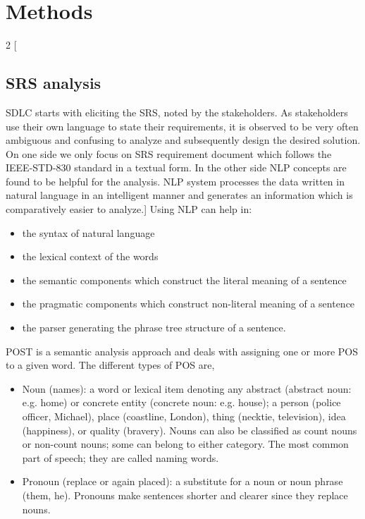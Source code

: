 \section{Methods}
	\begin{multicols*}{2}
		[\subsection{\gls{SRS} analysis}
		\gls{SDLC} starts with eliciting the \gls{SRS}, noted by the stakeholders. As stakeholders use their own language to state their requirements, it is observed to be very often ambiguous and confusing to analyze and subsequently design the desired solution. On one side we only focus on \gls{SRS} requirement document which follows the IEEE-STD-830 standard in a textual form. In the other side \gls{NLP} concepts are found to be helpful for the analysis. \gls{NLP} system processes the data written in natural language in an intelligent manner and generates an information which is comparatively easier to analyze.\cite{Tripathy}]
		Using \gls{NLP} can help in:
		\begin{itemize}
			\item the syntax of natural language
			\item the lexical context of the words
			\item the semantic components which construct the literal meaning of a sentence
			\item the pragmatic components which construct non-literal meaning of a sentence
			\item the parser generating the phrase tree structure of a sentence.
		\end{itemize}
		\gls{POST} is a semantic analysis approach and deals with assigning one or more \gls{POS} to a given word. The different types of \gls{POS} are,
		\begin{itemize}
			\item Noun (names): a word or lexical item denoting any abstract (abstract noun: e.g. home) or concrete entity (concrete noun: e.g. house); a person (police officer, Michael), place (coastline, London), thing (necktie, television), idea (happiness), or quality (bravery). Nouns can also be classified as count nouns or non-count nouns; some can belong to either category. The most common part of speech; they are called naming words.
			\item Pronoun (replace or again placed): a substitute for a noun or noun phrase (them, he). Pronouns make sentences shorter and clearer since they replace nouns.

\end{itemize}
\end{multicols*}
